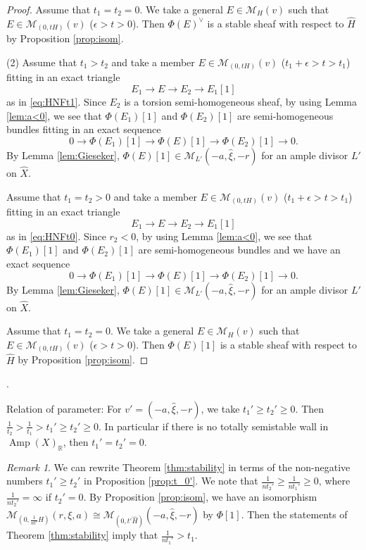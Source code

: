 \documentclass[10pt]{amsart}
\def\cal{\mathcal}
\def\Bbb{\mathbb}
\newenvironment{NB}{
\color{red}{\bf NB}. \footnotesize 
}{}
\newcommand{\Coh}{\operatorname{Coh}}
\newcommand{\Amp}{\operatorname{Amp}}
\numberwithin{equation}{section}
\theoremstyle{plain}
\theoremstyle{definition}
\theoremstyle{remark}
\newtheorem{rem}[thm]{Remark}
\begin{document}
\begin{proof}
Assume that $t_1=t_2=0$.
We take a general $E \in {\cal M}_H(v)$ such that  
$E \in  {\cal M}_{(0,tH)}(v)$ ($\epsilon> t>0$).
Then  $\Phi(E)^{\vee}$ is a stable sheaf with respect to $\widehat{H}$
by Proposition \ref{prop:isom}.

(2)
Assume that $t_1>t_2$ and take a member $E \in {\cal M}_{(0,tH)}(v)$ ($t_1+\epsilon> t>t_1$)
fitting in an exact triangle
$$
E_1 \to E \to E_2 \to E_1[1]
$$
as in \eqref{eq:HNFt1}.
Since $E_2$ is a torsion semi-homogeneous sheaf,
by using Lemma \ref{lem:a<0},
we see that $\Phi(E_1)[1]$ and $\Phi(E_2)[1]$
are semi-homogeneous bundles
fitting in an exact sequence
$$
0 \to \Phi(E_1)[1] \to \Phi(E)[1] \to \Phi(E_2)[1] \to 0.
$$
By Lemma \ref{lem:Gieseker}, 
$\Phi(E)[1] \in {\cal M}_{L'}(-a,\widehat{\xi},-r)$ for an ample divisor $L'$
on $\widehat{X}$.

Assume that $t_1=t_2>0$
and take a member $E \in {\cal M}_{(0,tH)}(v)$ ($t_1+\epsilon> t>t_1$)
fitting in an exact triangle
$$
E_1 \to E \to E_2 \to E_1[1]
$$
as in \eqref{eq:HNFt0}.
Since $r_2<0$, by using Lemma \ref{lem:a<0},
we see that $\Phi(E_1)[1] $ and $\Phi(E_2)[1]$
are semi-homogeneous bundles
and we have an exact sequence
$$
0 \to \Phi(E_1)[1] \to \Phi(E)[1] \to \Phi(E_2)[1] \to 0.
$$
By Lemma \ref{lem:Gieseker}, 
$\Phi(E)[1] \in {\cal M}_{L'}(-a,\widehat{\xi},-r)$ for an ample divisor $L'$
on $\widehat{X}$.

Assume that $t_1=t_2=0$. We take a general $E \in {\cal M}_H(v)$ such that  
$E \in  {\cal M}_{(0,tH)}(v)$ ($\epsilon> t>0$).
Then  $\Phi(E)[1]$ is a stable sheaf with respect to $\widehat{H}$
by Proposition \ref{prop:isom}.
\end{proof}

\begin{NB}
Relation of parameter:
For $v'=(-a,\widehat{\xi},-r)$, we take $t_1' \geq t_2' \geq 0$. Then
$\frac{1}{t_2}>\frac{1}{t_1}>t_1' \geq t_2' \geq 0$.
In particular if there is no totally semistable wall in $\Amp(X)_{\Bbb R}$, then
$t_1'=t_2'=0$. 
\end{NB}

\begin{rem}
We can rewrite Theorem \ref{thm:stability} in terms of the non-negative numbers $t_1' \geq t_2'$ 
in Proposition \ref{prop:t_0'}.
We note that $\frac{1}{n t_2'} \geq \frac{1}{n t_1'} \geq 0$, where $\frac{1}{n t_2'}=\infty$ if $t_2'=0$.
By Proposition \ref{prop:isom},
we have an isomorphism 
${\cal M}_{(0,\frac{1}{nt'}H)}(r,\xi,a) \cong {\cal M}_{(0,t' \widehat{H})}(-a,\widehat{\xi},-r)$
by $\Phi[1]$.
Then the statements of Theorem \ref{thm:stability} imply that
$\frac{1}{nt_1'}>t_1$.
\end{rem}
\end{document}
